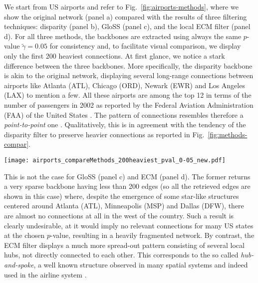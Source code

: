 \documentclass[aps,twocolumn,superscriptaddress]{revtex4-1}
\newcommand{\gloss}{GloSS }
\begin{document}
We start from US airports and refer to Fig.~\ref{fig:airports-methods}, where we show the original network (panel a) compared with the results of three filtering techniques: disparity (panel b), \gloss (panel c), and the local ECM filter (panel d). 
For all three methods, the backbones are extracted using always the same $p$-value $\widetilde{\gamma} = 0.05$ for consistency and, to facilitate visual comparison, we display only the first 200 heaviest connections. 
At first glance, we notice a stark difference between the three backbones. More specifically, the disparity backbone is akin to the original network, displaying several long-range connections between airports like Atlanta (ATL), Chicago (ORD), Newark (EWR) and Los Angeles (LAX) to mention a few. 
All these airports are among the top 12 in terms of the number of passengers in 2002 as reported by the Federal Aviation Administration (FAA) of the United States \cite{faa-data-2002}.
The pattern of connections resembles therefore a \emph{point-to-point} one \cite{barthelemy-physrep-2011}. Qualitatively, this is in agreement with the tendency of the disparity filter to preserve heavier connections as reported in Fig.~\ref{fig:methods-compar}.
%
\begin{figure*}[t]
\centering
\texttt{[image: airports\_compareMethods\_200heaviest\_pval\_0-05\_new.pdf]}
%
\caption{Filtered backbones of the US airport network. In each map, we display the top 200 heaviest connections for the original (a), disparity (b), \gloss (c) and ECM (d) networks. All the filtered backbones have been obtained using a common $p$-value equal to $\widetilde{\gamma}=0.05$.}
\label{fig:airports-methods}
\end{figure*}
%
This is not the case for \gloss (panel c) and ECM (panel d). The former returns a very sparse backbone having less than 200 edges (so all the retrieved edges are shown in this case) where, despite the emergence of some star-like structures centered around Atlanta (ATL), Minneapolis (MSP) and Dallas (DFW), there are almost no connections at all in the west of the country.
Such a result is clearly undesirable, at it would imply no relevant connections for many US states at the chosen $p$-value, resulting in a heavily fragmented network.
By contrast, the ECM filter displays a much more spread-out pattern consisting of several local hubs, not directly connected to each other. This corresponds to the so called \emph{hub-and-spoke}, a well known structure observed in many spatial systems and indeed used in the airline system \cite{bryan-jregsci-1999, barthelemy-physrep-2011}. 
\end{document}
